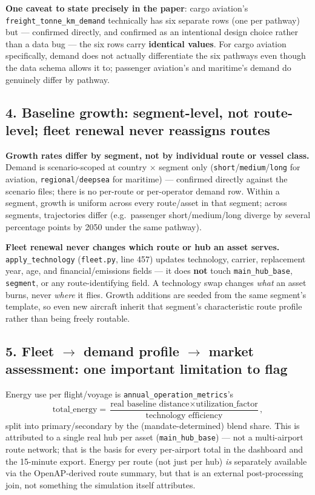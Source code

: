 \documentclass{article}
\begin{document}
\textbf{One caveat to state precisely in the paper}: cargo aviation's
\verb|freight_tonne_km_demand| technically has six separate rows (one per
pathway) but --- confirmed directly, and confirmed as an intentional design
choice rather than a data bug --- the six rows carry \textbf{identical
values}. For cargo aviation specifically, demand does not actually
differentiate the six pathways even though the data schema allows it to;
passenger aviation's and maritime's demand do genuinely differ by pathway.

\subsection*{4. Baseline growth: segment-level, not route-level; fleet
renewal never reassigns routes}

\textbf{Growth rates differ by segment, not by individual route or vessel
class.} Demand is scenario-scoped at country $\times$ segment only
(\texttt{short}/\texttt{medium}/\texttt{long} for aviation,
\texttt{regional}/\texttt{deepsea} for maritime) --- confirmed directly
against the scenario files; there is no per-route or per-operator demand
row. Within a segment, growth is uniform across every route/asset in that
segment; across segments, trajectories differ (e.g.\ passenger
short/medium/long diverge by several percentage points by 2050 under the
same pathway).

\textbf{Fleet renewal never changes which route or hub an asset serves.}
\verb|apply_technology| (\texttt{fleet.py}, line 457) updates technology,
carrier, replacement year, age, and financial/emissions fields --- it does
\textbf{not} touch \verb|main_hub_base|, \verb|segment|, or any
route-identifying field. A technology swap changes \emph{what} an asset
burns, never \emph{where} it flies. Growth additions are seeded from the
same segment's template, so even new aircraft inherit that segment's
characteristic route profile rather than being freely routable.

\subsection*{5. Fleet $\to$ demand profile $\to$ market assessment: one
important limitation to flag}

Energy use per flight/voyage is \verb|annual_operation_metrics|'s
\[
\text{total\_energy} = \frac{\text{real baseline distance} \times \text{utilization\_factor}}{\text{technology efficiency}},
\]
split into primary/secondary by the (mandate-determined) blend share. This
is attributed to a single real hub per asset (\verb|main_hub_base|) --- not
a multi-airport route network; that is the basis for every per-airport
total in the dashboard and the 15-minute export. Energy per route (not just
per hub) \emph{is} separately available via the OpenAP-derived route
summary, but that is an external post-processing join, not something the
simulation itself attributes.
\end{document}
